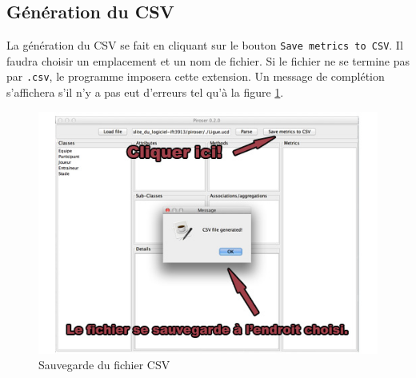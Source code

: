 \documentclass[12pt]{article}
\begin{document}
\subsection{Génération du CSV}

La génération du CSV se fait en cliquant sur le bouton \texttt{Save metrics to CSV}. Il faudra choisir un emplacement et un nom de fichier. Si le fichier ne se termine pas par \texttt{.csv}, le programme imposera cette extension. Un message de complétion s'affichera s'il n'y a pas eut d'erreurs tel qu'à la figure \ref{fig:save}.

\begin{figure}
\includegraphics[width=\textwidth]{save.jpg}
\caption{\label{fig:save}Sauvegarde du fichier CSV}
\end{figure}
\end{document}
